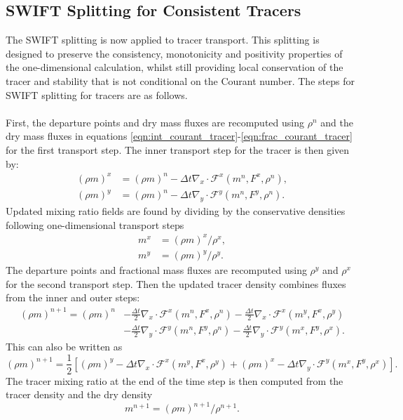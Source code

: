 \documentclass[11pt,a4paper]{article}
\begin{document}
\subsection{SWIFT Splitting for Consistent Tracers} \label{sec:swift_tracer}
The SWIFT splitting is now applied to tracer transport.
This splitting is designed to preserve the consistency, monotonicity and positivity properties of the one-dimensional calculation, whilst still providing local conservation of the tracer and stability that is not conditional on the Courant number.
The steps for SWIFT splitting for tracers are as follows. \\
\\
First, the departure points and dry mass fluxes are recomputed using $\rho^n$ and the dry mass fluxes in equations \eqref{eqn:int_courant_tracer}-\eqref{eqn:frac_courant_tracer} for the first transport step.
The inner transport step for the tracer is then given by:
\begin{subequations}
\begin{align}  \label{eqn:swift_split_1}   
        (\rho m)^x &= (\rho m)^n - \Delta{t} \nabla_x\cdot \mathcal{F}^x(m^n,F^{x},\rho^n), \\ \label{eqn:swift_split_2}
        (\rho m)^y &= (\rho m)^n - \Delta{t} \nabla_y\cdot \mathcal{F}^y(m^n,F^{y},\rho^n).
\end{align}
\end{subequations}
Updated mixing ratio fields are found by dividing by the conservative densities following one-dimensional transport steps
\begin{subequations}
\begin{align}
m^x &= (\rho m)^x / \rho^x, \\
m^y &= (\rho m)^y / \rho^y.
\end{align}
\end{subequations}
The departure points and fractional mass fluxes are recomputed using $\rho^y$ and $\rho^x$ for the second transport step.
Then the updated tracer density combines fluxes from the inner and outer steps:
\begin{equation} \label{eqn:swift_tracer}
\begin{split}
(\rho m)^{n+1} = (\rho m)^n & -\frac{\Delta{t}}{2}\nabla_x\cdot \mathcal{F}^x(m^n,F^{x},\rho^n) -\frac{\Delta{t}}{2}\nabla_x\cdot \mathcal{F}^x(m^y,F^{x},\rho^y) \\
        & - \frac{\Delta{t}}{2}\nabla_y\cdot \mathcal{F}^y(m^n,F^{y},\rho^n) -\frac{\Delta{t}}{2}\nabla_y\cdot \mathcal{F}^y(m^x,F^{y},\rho^x).
\end{split}
\end{equation}
This can also be written as
\begin{equation}
(\rho m)^{n+1} = \frac{1}{2}\left[(\rho m)^y - \Delta t \nabla_x\cdot \mathcal{F}^x(m^y,F^{x},\rho^y) + (\rho m)^x - \Delta t \nabla_y\cdot \mathcal{F}^y(m^x,F^{y},\rho^x) \right].
\end{equation}
The tracer mixing ratio at the end of the time step is then computed from the tracer density and the dry density
\begin{equation}
    m^{n+1} = (\rho m)^{n+1} / \rho^{n+1}.
\end{equation}
\end{document}
